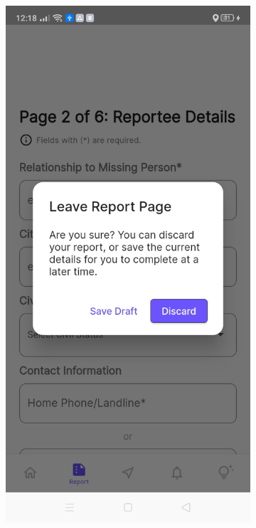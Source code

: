 \begin{figure}[!h]
    \centering
    \begin{subfigure}[c]{0.30\linewidth}
        \centering
        \includegraphics[scale=0.15]{figures/Chapter4/Main/leaveDialog.jpg}

\end{subfigure}
\end{figure}

